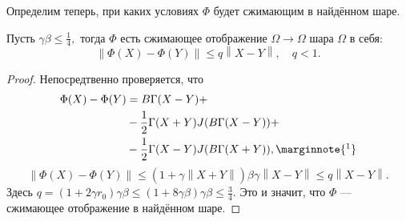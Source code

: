 Определим теперь, при каких условиях \( \Phi \) будет сжимающим в найдённом шаре.
\begin{lemma}
    Пусть \( \gamma\beta \leq \frac14, \)
    тогда \( \Phi \) есть сжимающее отображение \(\Omega\to\Omega\) шара \(\Omega\) в себя:
    \[ {\left\|\Phi(X)-\Phi(Y)\right\|} \leq q {\left\|X-Y\right\|}, \quad q<1.\]
\end{lemma}
\begin{proof}
    Непосредтвенно проверяется, что
    \begin{align*}
        \Phi(X) - \Phi(Y) &= B\Gamma (X-Y) + \\
        &- \frac12 \Gamma (X + Y)J(B\Gamma(X - Y)) + \\
        &- \frac12 \Gamma (X - Y)J(B\Gamma(X + Y)),
        \marginnote{\footnotemark}
    \end{align*}
    \[
        {\left\|\Phi(X) - \Phi(Y)\right\|} \leq (1 + \gamma{\left\|X+Y\right\|})\beta\gamma {\left\|X-Y\right\|} \leq q{\left\|X-Y\right\|}.
        \]
    Здесь
    \(
        q = (1+2\gamma r_0)\gamma\beta
        \leq (1+8\gamma\beta)\gamma\beta \leq \frac{3}{4}.
    \)
    Это и значит, что \( \Phi \) --- сжимающее отображение в найдённом шаре.
\end{proof}

